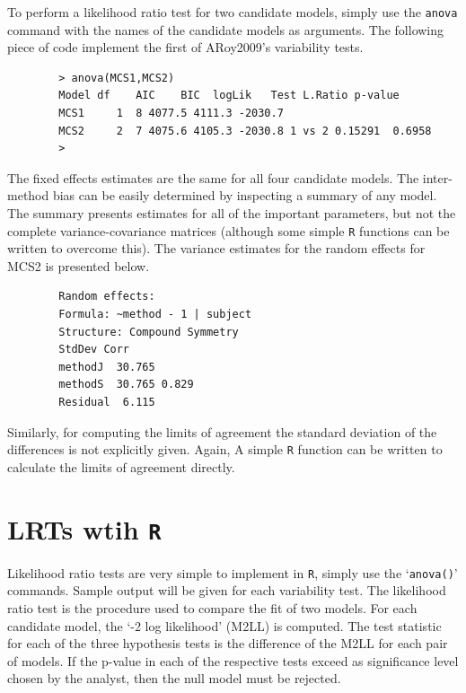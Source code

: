 \documentclass[12pt, a4paper]{report}
\theoremstyle{plain}
\theoremstyle{definition}
\theoremstyle{remark}
\begin{document}
	
	To perform a likelihood ratio test for two candidate models, simply use the \texttt{anova} command with the names of the candidate models as arguments. The following piece of code implement the first of ARoy2009's variability tests.
	
	\begin{framed}
		\begin{verbatim}
		> anova(MCS1,MCS2)
		Model df    AIC    BIC  logLik   Test L.Ratio p-value
		MCS1     1  8 4077.5 4111.3 -2030.7
		MCS2     2  7 4075.6 4105.3 -2030.8 1 vs 2 0.15291  0.6958
		>
		\end{verbatim}
	\end{framed}
	
	The fixed effects estimates are the same for all four candidate models. The inter-method bias can be easily determined by inspecting a summary of any model. The summary presents estimates for all of the important parameters, but not the complete variance-covariance matrices (although some simple \texttt{R} functions can be written to overcome this). The variance estimates for the random effects for MCS2 is presented below.
	
	\begin{framed}
		\begin{verbatim}
		Random effects:
		Formula: ~method - 1 | subject
		Structure: Compound Symmetry
		StdDev Corr
		methodJ  30.765
		methodS  30.765 0.829
		Residual  6.115
		\end{verbatim}
	\end{framed}
	\vspace{1cm}
	Similarly, for computing the limits of agreement the standard deviation of the differences is not explicitly given. Again, A simple \texttt{R} function can be written to calculate the limits of agreement directly.
	
	


\section{LRTs wtih \texttt{R}}
Likelihood ratio tests are very simple to implement in \texttt{R}, simply use the `\texttt{anova()}'
commands. Sample output will be given for each variability test. The likelihood ratio
test is the procedure used to compare the fit of two models. For each candidate model,
the `-2 log likelihood' (M2LL) is computed. The test statistic for each of the three
hypothesis tests is the difference of the M2LL for each pair of models. If the p-value
in each of the respective tests exceed as significance level chosen by the analyst, then
the null model must be rejected.
\end{document}
